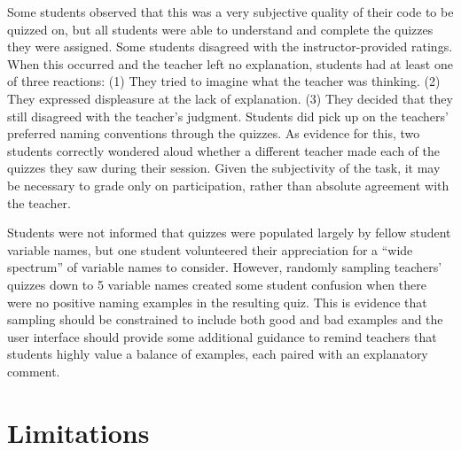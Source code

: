 Some students observed that this was a very subjective quality of their code to be quizzed on, but all students were able to understand and complete the quizzes they were assigned. Some students disagreed with the instructor-provided ratings. When this occurred and the teacher left no explanation, students had at least one of three reactions: (1) They tried to imagine what the teacher was thinking. (2) They expressed displeasure at the lack of explanation. (3) They decided that they still disagreed with the teacher's judgment. Students did pick up on the teachers' preferred naming conventions through the quizzes. As evidence for this, two students correctly wondered aloud whether a different teacher made each of the quizzes they saw during their session. Given the subjectivity of the task, it may be necessary to grade only on participation, rather than absolute agreement with the teacher.

Students were not informed that quizzes were populated largely by fellow student variable names, but one student volunteered their appreciation for a ``wide spectrum'' of variable names to consider. However, randomly sampling teachers' quizzes down to 5 variable names created some student confusion when there were no positive naming examples in the resulting quiz. This is evidence that sampling should be constrained to include both good and bad examples and the user interface should provide some additional guidance to remind teachers that students highly value a balance of examples, each paired with an explanatory comment.



\section{Limitations}

